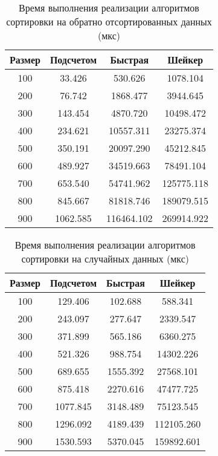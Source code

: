 \begin{table}[h]
	\begin{center}
		\caption{ Время выполнения реализации алгоритмов сортировки на обратно	отсортированных данных (мкс)}
		\label{tbl:wor}
		\begin{tabular}{|c|c|c|c|}
			\hline
			Размер & Подсчетом &  Быстрая &  Шейкер \\
			\hline
			100 &   33.426 &  530.626 & 1078.104\\
			\hline
			200 &   76.742 & 1868.477 & 3944.645\\
			\hline
			300 &  143.454 & 4870.720 & 10498.472\\
			\hline
			400 &  234.621 & 10557.311 & 23275.374\\
			\hline
			500 &  350.191 & 20097.290 & 45212.845\\
			\hline
			600 &  489.927 & 34519.663 & 78491.104\\
			\hline
			700 &  653.540 & 54741.962 & 125775.118\\
			\hline
			800 &  845.667 & 81818.746 & 189079.515\\
			\hline
			900 & 1062.585 & 116464.102 & 269914.922\\
			\hline
		\end{tabular}
	\end{center}
	
\end{table}
\FloatBarrier


\FloatBarrier

\begin{table}[h]
	\begin{center}
		\caption{ Время выполнения реализации алгоритмов сортировки на случайных данных (мкс)}
		\label{tbl:random}
		\begin{tabular}{|c|c|c|c|}
			\hline
			Размер & Подсчетом &  Быстрая &  Шейкер \\
			\hline
			100 &  129.406 &  102.688 &  588.341\\
			\hline
			200 &  243.097 &  277.647 & 2339.547\\
			\hline
			300 &  371.899 &  565.186 & 6360.275\\
			\hline
			400 &  521.326 &  988.754 & 14302.226\\
			\hline
			500 &  689.655 & 1555.392 & 27568.101\\
			\hline
			600 &  875.418 & 2270.616 & 47477.725\\
			\hline
			700 & 1077.845 & 3148.489 & 75123.545\\
			\hline
			800 & 1296.092 & 4189.439 & 112105.260\\
			\hline
			900 & 1530.593 & 5370.045 & 159892.601\\
			\hline
		\end{tabular}
	\end{center}

\end{table}
\FloatBarrier

